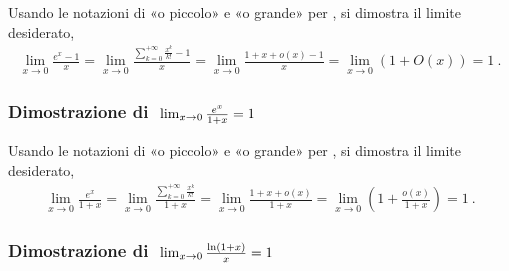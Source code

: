 \documentclass[letterpaper,10pt,italian]{jupyterBook}
\begin{document}
\sphinxAtStartPar
Usando le notazioni di «o piccolo» e «o grande» per {\hyperref[\detokenize{ch/infinitesimal_calculus/analysis:infinitesimal-calculus-limits-infinite-simal}]{}}, si dimostra il limite desiderato,
\begin{equation*}
\begin{split}\lim_{x \rightarrow 0} \frac{e^x - 1}{x} = \lim_{x \rightarrow 0} \frac{\sum_{k=0}^{+\infty} \frac{x^k}{k!} - 1}{x} = \lim_{x \rightarrow 0} \frac{1 + x + o(x) - 1}{x} = \lim_{x \rightarrow 0} \left( 1 + O(x) \right) = 1 \ .\end{split}
\end{equation*}\subsubsection*{Dimostrazione di \protect\(\ \lim_{x \rightarrow 0} \frac{e^x}{1 + x} = 1 \protect\)}

\sphinxAtStartPar
Usando le notazioni di «o piccolo» e «o grande» per {\hyperref[\detokenize{ch/infinitesimal_calculus/analysis:infinitesimal-calculus-limits-infinite-simal}]{}}, si dimostra il limite desiderato,
\begin{equation*}
\begin{split}\lim_{x \rightarrow 0} \frac{e^x}{1 + x} = \lim_{x \rightarrow 0} \frac{\sum_{k=0}^{+\infty} \frac{x^k}{k!}}{1+x} = \lim_{x \rightarrow 0} \frac{1 + x + o(x)}{1+x} = \lim_{x \rightarrow 0} \left( 1 + \frac{o(x)}{1+x} \right) = 1 \ .\end{split}
\end{equation*}\subsubsection*{Dimostrazione di \protect\(\ \lim_{x \rightarrow 0} \frac{\ln (1+x)}{x} = 1\protect\)}
\end{document}
